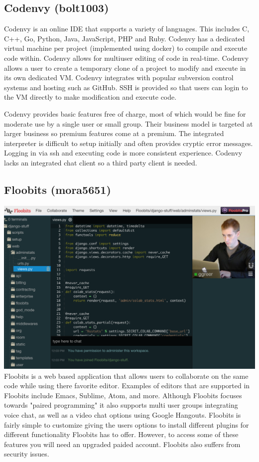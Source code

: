 \documentclass[11pt]{report}
\begin{document}
\subsection{Codenvy (bolt1003)}
Codenvy is an online IDE that supports a variety of languages. This includes C, C++, Go, Python, Java, JavaScript, PHP and Ruby. Codenvy has a dedicated virtual machine per project (implemented using docker) to compile and execute code within. Codenvy allows for multiuser editing of code in real-time. Codenvy allows a user to create a temporary clone of a project to modify and execute in its own dedicated VM. Codenvy integrates with popular subversion control systems and hosting such as GitHub. SSH is provided so that users can login to the VM directly to make modification and execute code.


Codenvy provides basic features free of charge, most of which would be fine for moderate use by a single user or small group.  Their business model is targeted at larger business so premium features come at a premium. The integrated interpreter is difficult to setup initially and often provides cryptic error messages. Logging in via ssh and executing code is more consistent experience. Codenvy lacks an integrated chat client so a third party client is needed.

\subsection{Floobits (mora5651)}
\includegraphics[width=\textwidth]{Floobits}
Floobits is a web based application that allows users to collaborate on the same code while using there favorite editor. Examples of editors that are supported in Floobits include Emacs, Sublime, Atom, and more. Although Floobits focuses towards "paired programming" it also supports multi user groups integrating voice chat, as well as a video chat options using Google Hangouts. Floobits is fairly simple to customize giving the users options to install different plugins for different functionality Floobits has to offer. However, to access some of these features you will need an upgraded paided account. Floobits also suffers from security issues.
\end{document}
